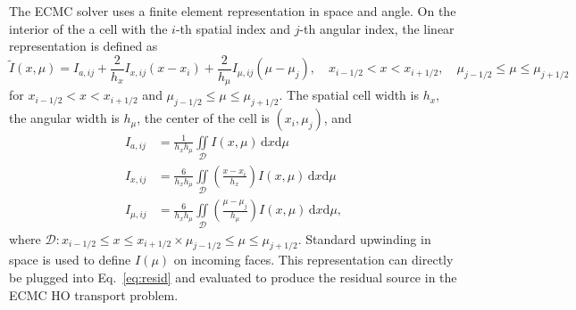 \documentclass{mc2013}
\renewcommand{\d}{\mathrm{d}}
\newcommand{\il}{{i-1/2}}
\newcommand{\ir}{{i+1/2}}
\newcommand{\jl}{{j-1/2}}
\newcommand{\jr}{{j+1/2}}
\begin{document}
The ECMC solver uses a finite element representation in space and angle. On the
interior of the a cell with the $i$-th spatial index and $j$-th angular index, the linear representation is defined as
\begin{equation*}
    \tilde I(x,\mu) = I_{a,ij} + \frac{2}{h_x}I_{x,ij}\left(x-x_i\right) +
    \frac{2}{h_\mu}I_{\mu,ij}\left(\mu-\mu_j\right), \quad x_\il <  x < x_\ir,\quad
     \mu_\jl \leq \mu \leq \mu_\jr
\end{equation*}
for $x_\il <  x <  x_\ir$ and $\mu_\jl \leq \mu \leq \mu_\jr$. The spatial cell width is $h_x$, the angular width is
$h_\mu$, the center of the cell is $(x_i,\mu_j)$, and
\begin{align}\label{app1}
    I_{a,ij} &= \frac{1}{h_x h_\mu} \iint\limits_{\mathcal{D}} I(x,\mu)\, \d x \d \mu \\
    I_{x,ij} &= \frac{6}{h_xh_\mu}\iint\limits_{\mathcal{D}} \left(\frac{x - x_i}{h_{x}}\right)
    I(x,\mu)\, \d x \d \mu \\ \label{app2}
    I_{\mu,ij} &= \frac{6}{h_xh_\mu}\iint\limits_{\mathcal{D}}
     \left(\frac{\mu - \mu_j}{h_{\mu}}\right)
    I(x,\mu)\, \d x \d \mu,
\end{align}
where $\mathcal{D}: x_\il \leq  x \leq  x_\ir \times \mu_\jl \leq \mu \leq \mu_\jr$.
Standard upwinding in space is used to
define $I(\mu)$  on incoming faces. This representation can directly be plugged into
Eq.~\eqref{eq:resid} and evaluated to produce the residual source in the ECMC HO transport
problem. 
\end{document}
